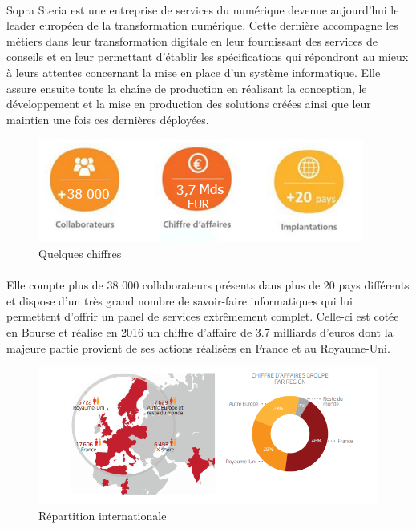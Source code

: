 \paragraph{}
Sopra Steria est une entreprise de services du numérique devenue aujourd'hui le leader européen de la transformation numérique. Cette dernière accompagne les métiers dans leur transformation digitale en leur fournissant des services de conseils et en leur permettant d'établir les spécifications qui répondront au mieux à leurs attentes concernant la mise en place d'un système informatique. Elle assure ensuite toute la chaîne de production en réalisant la conception, le développement et la mise en production des solutions créées ainsi que leur maintien une fois ces dernières déployées.

\begin{figure}[h]
	\includegraphics[scale=1]{images/entreprise/sopraSteriaChiffres.png}
	\centering
	\caption{Quelques chiffres}
	\label{sopraSteriaChiffres}
\end{figure}

\paragraph{}
Elle compte plus de 38 000 collaborateurs présents dans plus de 20 pays différents et dispose d'un très grand nombre de savoir-faire informatiques qui lui permettent d'offrir un panel de services extrêmement complet. Celle-ci est cotée en Bourse et réalise en 2016 un chiffre d'affaire de 3.7 milliards d'euros dont la majeure partie provient de ses actions réalisées en France et au Royaume-Uni.

\begin{figure}[h]
	\includegraphics[scale=0.9]{images/entreprise/sopraSteriaMonde.png}
	\centering
	\caption{Répartition internationale}
	\label{sopraSteriaMonde}
\end{figure}
		
		